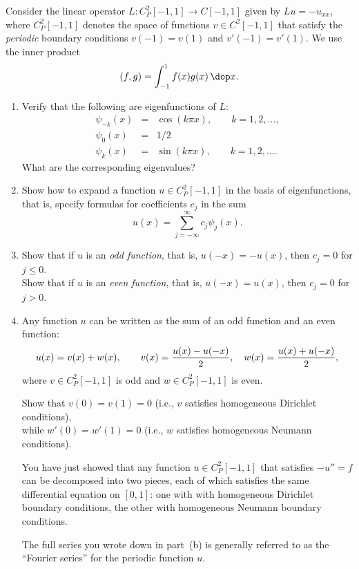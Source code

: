 Consider the linear operator $L:C^2_P[-1,1] \to C[-1,1]$
given by $Lu = -u_{xx}$,
where $C^2_P[-1,1]$ denotes the space of functions $v\in C^2[-1,1]$
that satisfy the \emph{periodic} boundary conditions $v(-1)=v(1)$ and $v'(-1)=v'(1)$.
We use the inner product
\[ (f,g) = \int_{-1}^1 f(x) g(x)\,\dop x.\]

\vspace*{1em}
\begin{enumerate}
\item Verify that the following are eigenfunctions of $L$:
\begin{eqnarray*}
    \psi_{-k}(x) &=& \cos(k \pi x), \qquad {k=1,2,\ldots, }\\[.5em]
    \psi_{0}(x) &=& 1/2 \\[.5em]
    \psi_{k}(x) &=& \sin(k \pi x), \qquad {k=1,2,\ldots. }
\end{eqnarray*}
What are the corresponding eigenvalues?  

\vspace*{1em} 
\item Show how to expand a function $u \in C^2_P[-1,1]$ 
      in the basis of
      eigenfunctions, that is, specify formulas for coefficients $c_j$
      in the sum
      \[ u(x) = \sum_{j=-\infty}^\infty c_j \psi_j(x).\]
   
\vspace*{1em} 
\item Show that if $u$ is an \emph{odd function}, that is, 
      $u(-x) = -u(x)$,
      then $c_j = 0$ for $j\le 0$.\\
      Show that if $u$ is an \emph{even function}, that is,
      $u(-x) = u(x)$, then $c_j = 0$ for $j>0$.\\[.25em]

\item Any function $u$ can be written as the sum of an odd function
      and an even function:
      \[ u(x) = v(x) + w(x), \qquad
         v(x) = {u(x) - u(-x)\over 2}, \quad
         w(x) = {u(x) + u(-x)\over 2},\]
      where $v\in C^2_P[-1,1]$ is odd 
      and $w\in C^2_P[-1,1]$ is even.

      Show that $v(0)=v(1)=0$ (i.e., $v$ satisfies homogeneous Dirichlet conditions), \\
      while $w'(0) = w'(1) = 0$ (i.e., $w$ satisfies homogeneous Neumann conditions). 

\vspace*{2em}

You have just showed that any function $u\in C^2_P[-1,1]$ that satisfies
$-u'' = f$ can be decomposed into two pieces, each of which satisfies 
the same differential equation on $[0,1]$: one with
with homogeneous Dirichlet boundary conditions, the other with
homogeneous Neumann boundary conditions.

\vspace*{1em}
The full series you wrote down in part~(b) is generally referred to
as the ``Fourier series'' for the periodic function $u$.

\end{enumerate}


